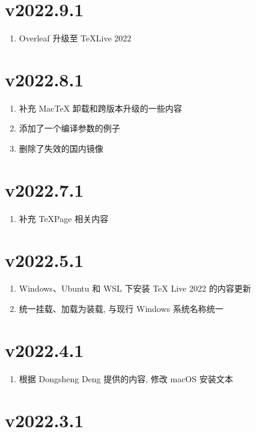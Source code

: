 \section*{v2022.9.1}

\begin{enumerate}
  \item Overleaf 升级至 \TeX Live 2022
\end{enumerate}

\section*{v2022.8.1}

\begin{enumerate}
  \item 补充 Mac\TeX{} 卸载和跨版本升级的一些内容
  \item 添加了一个编译参数的例子
  \item 删除了失效的国内镜像
\end{enumerate}

\section*{v2022.7.1}

\begin{enumerate}
  \item 补充 TeXPage 相关内容
\end{enumerate}

\section*{v2022.5.1}

\begin{enumerate}
  \item Windows、Ubuntu 和 WSL 下安装 \TeX{} Live 2022 的内容更新
  \item 统一挂载、加载为装载, 与现行 Windows 系统名称统一
\end{enumerate}

\section*{v2022.4.1}

\begin{enumerate}
  \item 根据 Dongsheng Deng 提供的内容, 修改 macOS 安装文本
\end{enumerate}

\section*{v2022.3.1}

